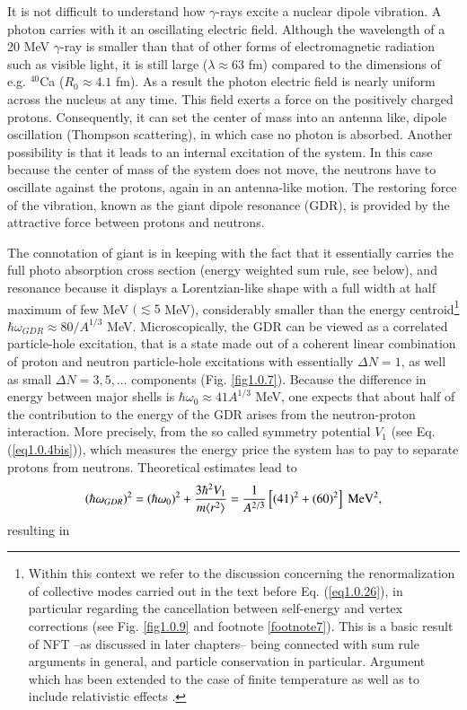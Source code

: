 It is not difficult to understand how $\gamma$-rays excite a nuclear dipole vibration. A photon carries with it an oscillating electric field. Although the wavelength of a 20 MeV $\gamma$-ray is smaller than that of other forms of electromagnetic radiation such as visible light, it is still large ($\lambda\approx63$ fm) compared to the dimensions of e.g. $^{40}$Ca ($R_0\approx4.1$ fm). As a result the photon electric field is nearly uniform across the nucleus at any time. This field exerts a force on the positively charged protons. Consequently, it can set the center of mass into an antenna like, dipole oscillation (Thompson scattering), in which case no photon is absorbed. Another possibility is that it leads to an internal excitation of the system. In this case because the center of mass of the system does not move, the neutrons have to oscillate against the protons, again in an antenna-like motion. The restoring force of the vibration, known as the giant dipole resonance (GDR), is provided by the attractive force between protons and neutrons.

The connotation of giant is in keeping with the fact that it essentially carries the full photo absorption cross section (energy weighted sum rule, see below), and resonance because it displays a Lorentzian-like shape with a full width at half maximum of few MeV $(\lesssim5$ MeV), considerably  smaller than the energy centroid\footnote{Within this context we refer to the discussion concerning the renormalization of collective modes carried out in the text before Eq. (\ref{eq1.0.26}), in particular regarding the cancellation between self-energy and vertex corrections (see Fig. \ref{fig1.0.9} and footnote \ref{footnote7}). This is a basic result of NFT --as discussed in later chapters-- being connected with sum rule arguments in general, and particle conservation in particular. Argument which has been extended to the case of finite temperature as well as to include relativistic effects \cite{Ward:50,Nambu:60,Bortignon:81,Bertsch:83,Bortignon:98,Litvinova:18,Wibowo:19}.} $\hbar\omega_{GDR}\approx80/A^{1/3}$ MeV. Microscopically, the GDR can be viewed as a correlated particle-hole excitation, that is a state made out of a coherent linear combination of proton and neutron particle-hole excitations with essentially $\Delta N=1$, as well as small $\Delta N=3,5,\dots$ components (Fig. \ref{fig1.0.7}). Because the difference in energy between major shells is $\hbar\omega_0\approx41A^{1/3}$ MeV, one expects that about half of the contribution to the energy of the GDR arises from the neutron-proton interaction. More precisely, from the so called  symmetry potential $V_1$ (see Eq.  (\ref{eq1.0.4bis})), which measures the energy price the system has to pay to separate protons from neutrons. Theoretical estimates lead to 
\begin{align}\label{eq0.1.106}
(\hbar\omega_{GDR})^2=(\hbar\omega_0)^2+\frac{3\hbar^2V_1}{m\langle {r^2} \rangle}=\frac{1}{A^{2/3}}\left[(41)^2+(60)^2\right]\text{ MeV}^2,
\end{align}
resulting in

